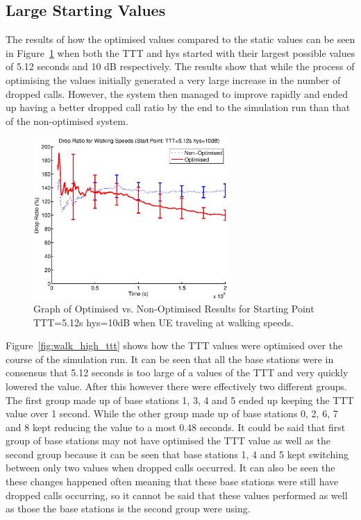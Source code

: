 \subsection{Large Starting Values}
The results of how the optimised values compared to the static values can be seen in Figure~\ref{fig:walk_high_drop} when both the TTT and hys started with their largest possible values of 5.12 seconds and 10 dB respectively. The results show that while the process of optimising the values initially generated a very large increase in the number of dropped calls. However, the system then managed to improve rapidly and ended up having a better dropped call ratio by the end to the simulation run than that of the non-optimised system.
\begin{figure}[H]
  \begin{center}
    	  \includegraphics[width=0.66\textwidth]{figures/walking_figures/walkhigh.eps}
    \end{center}
    \caption{Graph of Optimised vs. Non-Optimised Results for Starting Point TTT=5.12s hys=10dB when UE traveling at walking speeds.}
    \label{fig:walk_high_drop}
\end{figure}
Figure~\ref{fig:walk_high_ttt} shows how the TTT values were optimised over the course of the simulation run. It can be seen that all the base stations were in consensus that 5.12 seconds is too large of a values of the TTT and very quickly lowered the value. After this however there were effectively two different groups. The first group made up of base stations 1, 3, 4 and 5 ended up keeping the TTT value over 1 second. While the other group made up of base stations 0, 2, 6, 7 and 8 kept reducing the value to a most 0.48 seconds. It could be said that first group of base stations may not have optimised the TTT value as well as the second group because it can be seen that base stations 1, 4 and 5 kept switching between only two values when dropped calls occurred. It can also be seen the these changes happened often meaning that these base stations were still have dropped calls occurring, so it cannot be said that these values performed as well as those the base stations is the second group were using.
